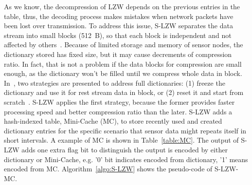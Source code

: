As we know, the decompression of LZW depends on the previous entries in the
table, thus, the decoding process makes mistakes when network packets have been lost
over transmission. To address this issue, S-LZW separates the data stream into small
blocks (512~B), so that each block is independent and not affected by
others~\cite{sadler2006data}. Because of limited storage and memory of sensor
nodes, the dictionary stored has fixed size, but it may cause decrements of
compression ratio. In fact, that is not a problem if the data blocks for
compression are small enough, as the dictionary won't be filled until we compress
whole data in block. In~\cite{sadler2006data}, two strategies are presented to address
full dictionaries: (1) freeze the dictionary and use it for rest stream data in block,
or (2) reset it and start from scratch~\cite{sadler2006data}. S-LZW applies the first
strategy, because the former provides faster processing speed and better
compression ratio than the later. S-LZW adds a hash-indexed table,
Mini-Cache (MC), to store recently used and created dictionary entries for the
specific scenario that sensor data might repeats itself in short intervals. A
example of MC is shown in Table~\ref{table:MC}. The output of S-LZW adds one
extra flag bit to distinguish the output is encoded by either dictionary or
Mini-Cache, e.g. '0' bit indicates encoded from dictionary, '1' means encoded
from MC. Algorithm~\ref{algo:S-LZW} shows the pseudo-code of S-LZW-MC.

